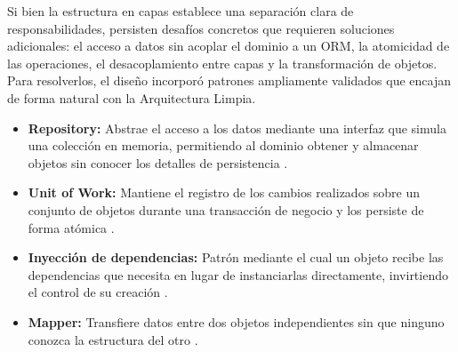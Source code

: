 




Si bien la estructura en capas establece una separación clara de responsabilidades, persisten desafíos concretos que requieren soluciones adicionales: el acceso a datos sin acoplar el dominio a un ORM, la atomicidad de las operaciones, el desacoplamiento entre capas y la transformación de objetos. 
Para resolverlos, el diseño incorporó patrones ampliamente validados que encajan de forma natural con la Arquitectura Limpia.

\begin{itemize}
    \item \textbf{Repository:} Abstrae el acceso a los datos mediante una interfaz que simula una colección en memoria, permitiendo al dominio obtener y almacenar objetos sin conocer los detalles de persistencia \cite{evans2003, fowler2002}.
    
    \item \textbf{Unit of Work:} Mantiene el registro de los cambios realizados sobre un conjunto de objetos durante una transacción de negocio y los persiste de forma atómica \cite{fowler2002}.
    
    \item \textbf{Inyección de dependencias:} Patrón mediante el cual un objeto recibe las dependencias que necesita en lugar de instanciarlas directamente, invirtiendo el control de su creación \cite{fowler2004}.
    
    \item \textbf{Mapper:} Transfiere datos entre dos objetos independientes sin que ninguno conozca la estructura del otro \cite{fowler2002}.
\end{itemize}

